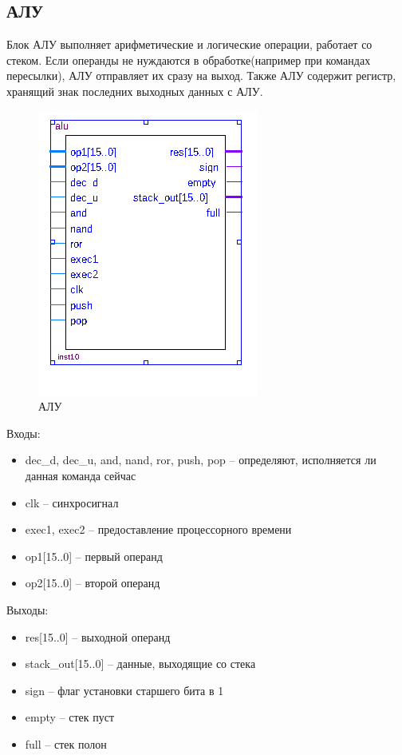 \subsection{АЛУ}
Блок АЛУ выполняет арифметические и логические операции, работает со стеком. Если операнды не нуждаются в обработке(например при командах пересылки), АЛУ отправляет их сразу на выход. Также АЛУ содержит регистр, хранящий знак последних выходных данных с АЛУ.

\begin{figure}[ht]{\textwidth}
\centering
    \includegraphics[scale=0.8]{alub}
    \caption{АЛУ}
\end{figure}

Входы:
\begin{itemize}
    \item dec\_d, dec\_u, and, nand, ror, push, pop -- определяют, исполняется ли данная команда сейчас
    \item clk -- синхросигнал
    \item exec1, exec2 -- предоставление процессорного времени
    \item op1[15..0] -- первый операнд
    \item op2[15..0] -- второй операнд
\end{itemize}
Выходы:
\begin{itemize}
    \item res[15..0] -- выходной операнд
    \item stack\_out[15..0] -- данные, выходящие со стека
    \item sign -- флаг установки старшего бита в 1
    \item empty -- стек пуст
    \item full -- стек полон
\end{itemize}

